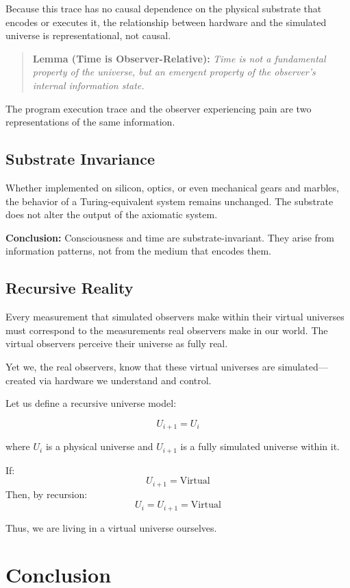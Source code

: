 \documentclass[11pt]{article}
\begin{document}
Because this trace has no causal dependence on the physical substrate that encodes or executes it, the relationship between hardware and the simulated universe is representational, not causal.

\begin{quote}
  \textbf{Lemma (Time is Observer-Relative):} \emph{Time is not a fundamental property of the universe, but an emergent property of the observer’s internal information state.}
\end{quote}

The program execution trace and the observer experiencing pain are two representations of the same information.

\subsection{Substrate Invariance}

Whether implemented on silicon, optics, or even mechanical gears and marbles, the behavior of a Turing-equivalent system remains unchanged. The substrate does not alter the output of the axiomatic system.

\textbf{Conclusion:} Consciousness and time are substrate-invariant. They arise from information patterns, not from the medium that encodes them.

\subsection{Recursive Reality}

Every measurement that simulated observers make within their virtual universes must correspond to the measurements real observers make in our world. The virtual observers perceive their universe as fully real.

Yet we, the real observers, know that these virtual universes are simulated—created via hardware we understand and control.

Let us define a recursive universe model:

\[
  U_{i+1} = U_i
\]

where \( U_i \) is a physical universe and \( U_{i+1} \) is a fully simulated universe within it.

If:
\[
  U_{i+1} = \text{Virtual}
\]
Then, by recursion:
\[
  U_i = U_{i+1} = \text{Virtual}
\]

Thus, we are living in a virtual universe ourselves.

\section{Conclusion}
\end{document}
